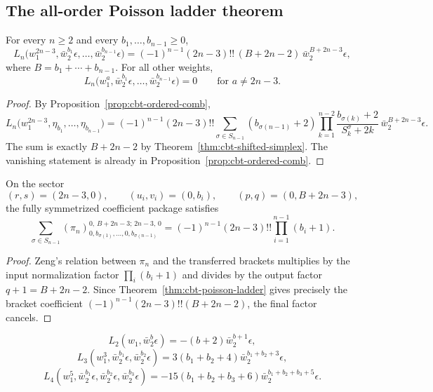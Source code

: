 \subsection{The all-order Poisson ladder theorem}
\label{sec:cbt-poisson-ladder}

\begin{theorem}
\label{thm:cbt-poisson-ladder}
\ClaimStatusProvedHere
For every $n\ge2$ and every $b_1,\dots,b_{n-1}\ge0$,
\[
L_n\bigl(w_1^{2n-3},\bar w_2^{b_1}\epsilon,\dots,\bar w_2^{b_{n-1}}\epsilon\bigr)
=
(-1)^{n-1}(2n-3)!!\,(B+2n-2)\,\bar w_2^{B+2n-3}\epsilon,
\]
where $B=b_1+\cdots+b_{n-1}$. For all other weights,
\[
L_n\bigl(w_1^a,\bar w_2^{b_1}\epsilon,\dots,\bar w_2^{b_{n-1}}\epsilon\bigr)=0
\qquad\text{for } a\neq 2n-3.
\]
\end{theorem}

\begin{proof}
By Proposition~\ref{prop:cbt-ordered-comb},
\[
L_n\bigl(w_1^{2n-3},\eta_{b_1},\dots,\eta_{b_{n-1}}\bigr)
=
(-1)^{n-1}(2n-3)!!
\sum_{\sigma\in S_{n-1}}
(b_{\sigma(n-1)}+2)\prod_{k=1}^{n-2}
\frac{b_{\sigma(k)}+2}{S_k^\sigma+2k}\,
\bar w_2^{B+2n-3}\epsilon.
\]
The sum is exactly $B+2n-2$ by Theorem~\ref{thm:cbt-shifted-simplex}. The vanishing statement is already in Proposition~\ref{prop:cbt-ordered-comb}.
\end{proof}

\begin{corollary}
\label{cor:cbt-pi-n-formula}
\ClaimStatusProvedHere
On the sector
\[
(r,s)=(2n-3,0),
\qquad
(u_i,v_i)=(0,b_i),
\qquad
(p,q)=(0,B+2n-3),
\]
the fully symmetrized coefficient package satisfies
\[
\sum_{\sigma\in S_{n-1}}
(\pi_n)^{0,\,B+2n-3;\,2n-3,\,0}_{0,b_{\sigma(1)},\dots,0,b_{\sigma(n-1)}}
=
(-1)^{n-1}(2n-3)!!\prod_{i=1}^{n-1}(b_i+1).
\]
\end{corollary}

\begin{proof}
Zeng's relation between $\pi_n$ and the transferred brackets multiplies by the input normalization factor $\prod_i (b_i+1)$ and divides by the output factor $q+1=B+2n-2$. Since Theorem~\ref{thm:cbt-poisson-ladder} gives precisely the bracket coefficient $(-1)^{n-1}(2n-3)!!(B+2n-2)$, the final factor cancels.
\end{proof}

\begin{corollary}[examples]
\label{cor:cbt-poisson-examples}
\ClaimStatusProvedHere
\[
L_2(w_1,\bar w_2^b\epsilon)=-(b+2)\bar w_2^{b+1}\epsilon,
\]
\[
L_3(w_1^3,\bar w_2^{b_1}\epsilon,\bar w_2^{b_2}\epsilon)=
3(b_1+b_2+4)\bar w_2^{b_1+b_2+3}\epsilon,
\]
\[
L_4(w_1^5,\bar w_2^{b_1}\epsilon,\bar w_2^{b_2}\epsilon,\bar w_2^{b_3}\epsilon)=
-15(b_1+b_2+b_3+6)\bar w_2^{b_1+b_2+b_3+5}\epsilon.
\]
\end{corollary}

